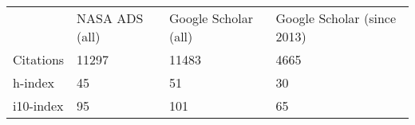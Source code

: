 \begin{tabularx}{\textwidth}{llll}
	&NASA ADS (all) & Google Scholar (all) & Google Scholar (since 2013)\\ %
Citations&11297&11483	&4665\\
h-index & 45&51&30\\
i10-index & 95 &101	&65\\
\end{tabularx}